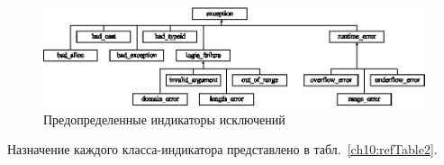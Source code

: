 \begin{figure}[htb]
\begin{center}
\includegraphics[width=\textwidth]{img/ris_10_5}
\caption{Предопределенные индикаторы исключений}
\label{ch10:refDrawing4}
\end{center}
\end{figure}

Назначение каждого класса-индикатора представлено в табл.~\ref{ch10:refTable2}.

